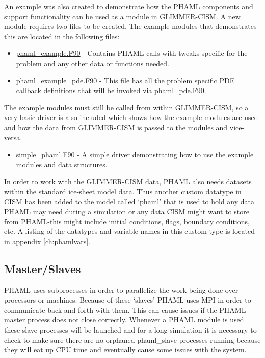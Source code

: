 An example was also created to demonstrate how the PHAML components and support functionality can be used as a module in GLIMMER-CISM.  A new module requires two files to be created.  The example modules that demonstrates this are located in the following files:

\begin{itemize}
\item \href{http://svn.berlios.de/svnroot/repos/glimmer-cism/glimmer-cism2/libphaml/phaml\_example.F90}{phaml\_example.F90} - Contains PHAML calls with tweaks specific for the problem and any other data or functions needed.
\item \href{http://svn.berlios.de/svnroot/repos/glimmer-cism/glimmer-cism2/libphaml/phaml\_example\_pde.F90}{phaml\_example\_pde.F90} - This file has all the problem specific PDE callback definitions that will be invoked via phaml\_pde.F90.
\end{itemize}

The example modules must still be called from within GLIMMER-CISM, so a very basic driver is also included which shows how the example modules are used and how the data from GLIMMER-CISM is passed to the modules and vice-versa.

\begin{itemize}
\item \href{http://svn.berlios.de/svnroot/repos/glimmer-cism/glimmer-cism2/libphaml/simple\_phaml.F90}{simple\_phaml.F90} - A simple driver demonstrating how to use the example modules and data structures.
\end{itemize}

In order to work with the GLIMMER-CISM data, PHAML also needs datasets within the standard ice-sheet model data.  Thus another custom datatype in CISM has been added to the model called `phaml' that is used to hold any data PHAML may need during a simulation or any data CISM might want to store from PHAML-this might include initial conditions, flags, boundary conditions, etc.  A listing of the datatypes and variable names in this custom type is located in appendix \ref{ch:phamlvars}.

\subsection{Master/Slaves}

PHAML uses subprocesses in order to parallelize the work being done over processors or machines.  Because of these `slaves' PHAML uses MPI in order to communicate back and forth with them.  This can cause issues if the PHAML master process does not close correctly.  Whenever a PHAML module is used these slave processes will be launched and for a long simulation it is necessary to check to make sure there are no orphaned phaml\_slave processes running because they will eat up CPU time and eventually cause some issues with the system.



